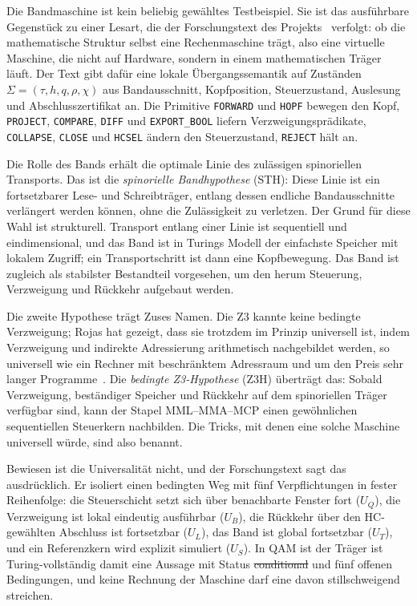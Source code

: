Die Bandmaschine ist kein beliebig gewähltes Testbeispiel. Sie ist das ausführbare Gegenstück zu einer Lesart, die der Forschungstext
des Projekts~\cite{companion} verfolgt: ob die mathematische Struktur selbst eine Rechenmaschine trägt, also eine virtuelle Maschine,
die nicht auf Hardware, sondern in einem mathematischen Träger läuft. Der Text gibt dafür eine lokale Übergangssemantik auf Zuständen
\(\Sigma=(\tau,h,q,\rho,\chi)\) aus Bandausschnitt, Kopfposition, Steuerzustand, Auslesung und Abschlusszertifikat an. Die Primitive
\texttt{FORWARD} und \texttt{HOPF} bewegen den Kopf, \texttt{PROJECT}, \texttt{COMPARE}, \texttt{DIFF} und \texttt{EXPORT\_BOOL} liefern
Verzweigungsprädikate, \texttt{COLLAPSE}, \texttt{CLOSE} und \texttt{HCSEL} ändern den Steuerzustand, \texttt{REJECT} hält an.

Die Rolle des Bands erhält die \glqq optimale Linie\grqq{} des zulässigen spinoriellen Transports. Das ist die \emph{spinorielle
Bandhypothese} (STH): Diese Linie ist ein fortsetzbarer Lese- und Schreibträger, entlang dessen endliche Bandausschnitte verlängert
werden können, ohne die Zulässigkeit zu verletzen. Der Grund für diese Wahl ist strukturell. Transport entlang einer Linie ist sequentiell
und eindimensional, und das Band ist in Turings Modell der einfachste Speicher mit lokalem Zugriff; ein Transportschritt ist dann eine
Kopfbewegung. Das Band ist zugleich als stabilster Bestandteil vorgesehen, um den herum Steuerung, Verzweigung und Rückkehr aufgebaut
werden.

Die zweite Hypothese trägt Zuses Namen. Die Z3 kannte keine bedingte Verzweigung; Rojas hat gezeigt, dass sie trotzdem im Prinzip
universell ist, indem Verzweigung und indirekte Adressierung arithmetisch nachgebildet werden, so universell wie ein Rechner mit
beschränktem Adressraum und um den Preis sehr langer Programme~\cite{rojas98}. Die \emph{bedingte Z3-Hypothese} (Z3H) überträgt das:
Sobald Verzweigung, beständiger Speicher und Rückkehr auf dem spinoriellen Träger verfügbar sind, kann der Stapel MML--MMA--MCP einen
gewöhnlichen sequentiellen Steuerkern nachbilden. Die \glqq Tricks\grqq{}, mit denen eine solche Maschine universell würde, sind also benannt.

Bewiesen ist die Universalität nicht, und der Forschungstext sagt das ausdrücklich. Er isoliert einen bedingten Weg mit fünf
Verpflichtungen in fester Reihenfolge: die Steuerschicht setzt sich über benachbarte Fenster fort (\(U_Q\)), die Verzweigung ist lokal
eindeutig ausführbar (\(U_B\)), die Rückkehr über den HC-gewählten Abschluss ist fortsetzbar (\(U_L\)), das Band ist global fortsetzbar
(\(U_T\)), und ein Referenzkern wird explizit simuliert (\(U_S\)). In QAM ist \glqq der Träger ist Turing-vollständig\grqq{} damit eine Aussage
mit Status \st{conditional} und fünf offenen Bedingungen, und keine Rechnung der Maschine darf eine davon stillschweigend streichen.

